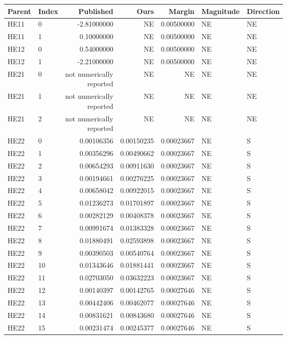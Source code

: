 \documentclass[11pt]{article}
\begin{document}
{\small\setlength{\tabcolsep}{4pt}
\begin{longtable}{llrrrll}
\toprule Parent & Index & Published & Ours & Margin & Magnitude & Direction\\\midrule\endhead
HE11 & 0 & -2.81000000 & NE & 0.00500000 & NE & NE\\
HE11 & 1 & 0.10000000 & NE & 0.00500000 & NE & NE\\
HE12 & 0 & 0.54000000 & NE & 0.00500000 & NE & NE\\
HE12 & 1 & -2.21000000 & NE & 0.00500000 & NE & NE\\
HE21 & 0 & \shortstack{not numerically\\reported} & NE & NE & NE & NE\\
HE21 & 1 & \shortstack{not numerically\\reported} & NE & NE & NE & NE\\
HE21 & 2 & \shortstack{not numerically\\reported} & NE & NE & NE & NE\\
HE22 & 0 & 0.00106356 & 0.00150235 & 0.00023667 & NE & S\\
HE22 & 1 & 0.00356296 & 0.00490662 & 0.00023667 & NE & S\\
HE22 & 2 & 0.00654293 & 0.00911630 & 0.00023667 & NE & S\\
HE22 & 3 & 0.00194661 & 0.00276225 & 0.00023667 & NE & S\\
HE22 & 4 & 0.00658042 & 0.00922015 & 0.00023667 & NE & S\\
HE22 & 5 & 0.01236273 & 0.01701897 & 0.00023667 & NE & S\\
HE22 & 6 & 0.00282129 & 0.00408378 & 0.00023667 & NE & S\\
HE22 & 7 & 0.00991674 & 0.01383328 & 0.00023667 & NE & S\\
HE22 & 8 & 0.01880491 & 0.02593898 & 0.00023667 & NE & S\\
HE22 & 9 & 0.00390503 & 0.00540764 & 0.00023667 & NE & S\\
HE22 & 10 & 0.01343646 & 0.01881441 & 0.00023667 & NE & S\\
HE22 & 11 & 0.02703050 & 0.03632223 & 0.00023667 & NE & S\\
HE22 & 12 & 0.00140397 & 0.00142765 & 0.00027646 & NE & S\\
HE22 & 13 & 0.00442406 & 0.00462077 & 0.00027646 & NE & S\\
HE22 & 14 & 0.00831621 & 0.00843680 & 0.00027646 & NE & S\\
HE22 & 15 & 0.00231474 & 0.00245377 & 0.00027646 & NE & S\\

\end{longtable}}
\end{document}
